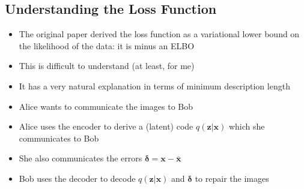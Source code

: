 \begin{slide}
\section[-2]{Understanding the Loss Function}

\begin{PauseHighLight}
  \begin{itemize}\squeeze
  \item The original paper derived the loss function as a variational
    lower bound on the likelihood of the data: it is minus an ELBO\pause
  \item This is difficult to understand (at least, for me)\pause
  \item It has a very natural explanation in terms of minimum
    description length\pause
  \item Alice wants to communicate the images to Bob\pause
  \item Alice uses the encoder to derive a (latent) code
    $q(\bm{z}|\bm{x})$ which she communicates to Bob\pause
  \item She also communicates the errors $\bm{\delta}=\bm{x}-\bar{\bm{x}}$\pause
  \item Bob uses the decoder to decode $q(\bm{z}|\bm{x})$ and
    $\bm{\delta}$ to repair the images\pause
  \end{itemize}
\end{PauseHighLight}


\end{slide}


